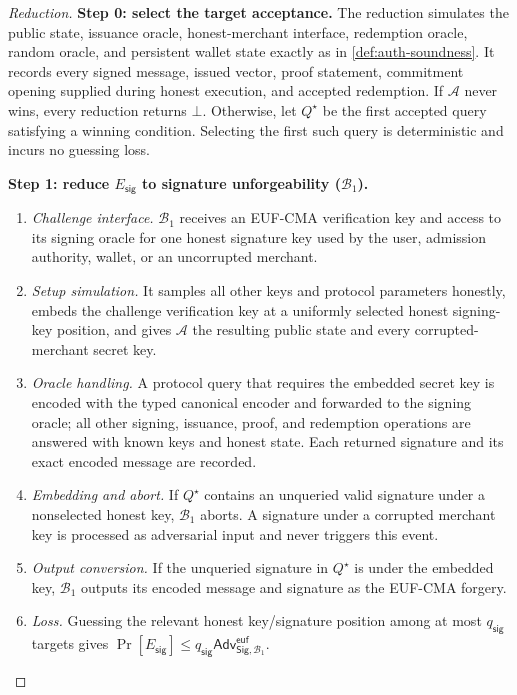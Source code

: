\documentclass[letterpaper]{article}
\newcommand{\adv}{\mathcal{A}}
\newcommand{\sig}{\mathsf{Sig}}
\newcommand{\Adv}{\mathsf{Adv}}
\begin{document}
\begin{proof}[Reduction]
\textbf{Step 0: select the target acceptance.}
The reduction simulates the public state, issuance oracle, honest-merchant
interface, redemption oracle, random oracle, and persistent wallet state
exactly as in \cref{def:auth-soundness}. It records every signed message, issued
vector, proof statement, commitment opening supplied during honest execution,
and accepted redemption. If \(\adv\) never wins, every reduction returns
\(\bot\). Otherwise, let \(Q^\star\) be the first accepted query satisfying a
winning condition. Selecting the first such query is deterministic and incurs
no guessing loss.

\textbf{Step 1: reduce \(E_{\mathsf{sig}}\) to signature unforgeability
(\(\mathcal B_1\)).}
\begin{enumerate}
  \item \emph{Challenge interface.} \(\mathcal B_1\) receives an EUF-CMA
  verification key and access to its signing oracle for one honest signature
  key used by the user, admission authority, wallet, or an uncorrupted
  merchant.
  \item \emph{Setup simulation.} It samples all other keys and protocol
  parameters honestly, embeds the challenge verification key at a uniformly
  selected honest signing-key position, and gives \(\adv\) the resulting public
  state and every corrupted-merchant secret key.
  \item \emph{Oracle handling.} A protocol query that requires the embedded
  secret key is encoded with the typed canonical encoder and forwarded to the
  signing oracle; all other signing, issuance, proof, and redemption operations
  are answered with known keys and honest state. Each returned signature and
  its exact encoded message are recorded.
  \item \emph{Embedding and abort.} If \(Q^\star\) contains an unqueried valid
  signature under a nonselected honest key, \(\mathcal B_1\) aborts. A signature
  under a corrupted merchant key is processed as adversarial input and never
  triggers this event.
  \item \emph{Output conversion.} If the unqueried signature in \(Q^\star\) is
  under the embedded key, \(\mathcal B_1\) outputs its encoded message and
  signature as the EUF-CMA forgery.
  \item \emph{Loss.} Guessing the relevant honest key/signature position among
  at most \(q_{\mathsf{sig}}\) targets gives
  \(\Pr[E_{\mathsf{sig}}]\le
  q_{\mathsf{sig}}\Adv^{\mathsf{euf}}_{\sig,\mathcal B_1}\).
\end{enumerate}


\end{proof}
\end{document}
